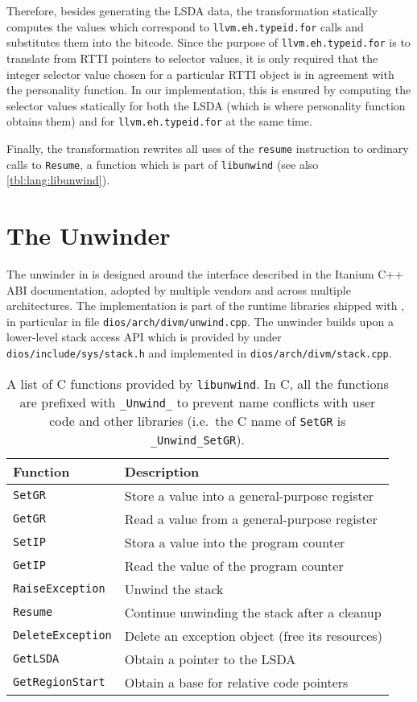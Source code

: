 Therefore, besides generating the LSDA data, the transformation
statically computes the values which correspond to
\texttt{llvm.eh.typeid.for} calls and substitutes them into the bitcode.
Since the purpose of \texttt{llvm.eh.typeid.for} is to translate from
RTTI pointers to selector values, it is only required that the integer
selector value chosen for a particular RTTI object is in agreement with
the personality function. In our implementation, this is ensured by
computing the selector values statically for both the LSDA (which is
where personality function obtains them) and for
\texttt{llvm.eh.typeid.for} at the same time.

Finally, the transformation rewrites all uses of the \texttt{resume}
instruction to ordinary calls to \texttt{Resume}, a function which is
part of \texttt{libunwind} (see also \autoref{tbl:lang:libunwind}).

\section{The Unwinder}\label{sec:lang:unwinder}

The unwinder in \divine{} is designed around the interface described in the
Itanium C++ ABI documentation,
adopted by multiple vendors and across multiple architectures. The
implementation is part of the runtime libraries shipped with
\divine{}, in particular in file \texttt{dios/arch/divm/unwind.cpp}.
The
unwinder builds upon a lower-level stack access API which is provided by
\dios{} under \texttt{dios/include/sys/stack.h} and implemented in \texttt{dios/arch/divm/stack.cpp}.

\begin{table}[tp]
\caption{A list of C functions provided by \texttt{libunwind}. In C, all the
functions are prefixed with \texttt{\_Unwind\_} to prevent name conflicts with
user code and other libraries (i.e.~the C name of \texttt{SetGR} is
\texttt{\_Unwind\_SetGR}). }\label{tbl:lang:libunwind}

\begin{tabularx}{\textwidth}{lL}
\toprule
Function & Description\\
\midrule
\texttt{SetGR} & Store a value into a general-purpose register\\
\texttt{GetGR} & Read a value from a general-purpose register\\
\texttt{SetIP} & Stora a value into the program counter\\
\texttt{GetIP} & Read the value of the program counter\\
\texttt{RaiseException} & Unwind the stack\\
\texttt{Resume} & Continue unwinding the stack after a cleanup\\
\texttt{DeleteException} & Delete an exception object (free its resources)\\
\texttt{GetLSDA} & Obtain a pointer to the LSDA\\
\texttt{GetRegionStart} & Obtain a base for relative code pointers\\
\bottomrule
\end{tabularx}
\end{table}

